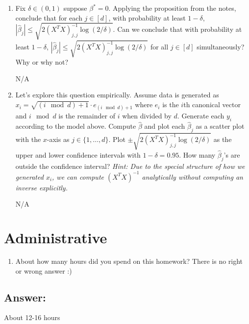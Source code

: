 \documentclass[shortlabels]{article}
\begin{document}
\begin{bprob}
\begin{enumerate}
\begin{proof}
        \end{proof}
        \newpage
        \item {} Fix $\delta \in (0,1)$ suppose $\beta^* = 0$. Applying the proposition from the notes, conclude that for each $j \in [d]$, with probability at least $1-\delta$, $|\widehat{\beta}_j| \leq \sqrt{2(X^TX)^{-1}_{j, j} \log(2 / \delta)}$.
        Can we conclude that with probability at least $1-\delta$,  $|\widehat{\beta}_j| \leq \sqrt{2(X^TX)^{-1}_{j, j} \log(2 / \delta)}$ for all $j \in [d]$ simultaneously? Why or why not?
        
        N/A
        
        \item {} Let's explore this question empirically. Assume data is generated as $x_i = \sqrt{(i \mod d) + 1} \cdot e_{(i \mod d) + 1}$ where $e_i$ is the $i$th canonical vector and $i \mod d$ is the remainder of $i$ when divided by $d$. Generate each $y_i$ according to the model above. 
        Compute $\widehat{\beta}$ and plot each $\widehat{\beta}_j$ as a scatter plot with the $x$-axis as $j \in \{1,\dots,d\}$. Plot $\pm \sqrt{2(X^TX)^{-1}_{j, j} \log(2 / \delta)}$ as the upper and lower confidence intervals with $1 - \delta = 0.95$. How many $\widehat{\beta}_j$'s are outside the confidence interval?  \emph{Hint: Due to the special structure of how we generated $x_i$, we can compute $(X^TX)^{-1}$ analytically without computing an inverse explicitly.}

        N/A
        
    \end{enumerate}

\end{bprob}

\newpage
\section*{Administrative}
\begin{aprob}
\begin{enumerate}
    \item {} About how many hours did you spend on this homework? There is no right or wrong answer :)
\end{enumerate}

\subsection*{Answer:}
About 12-16 hours

\end{aprob}
\end{document}

